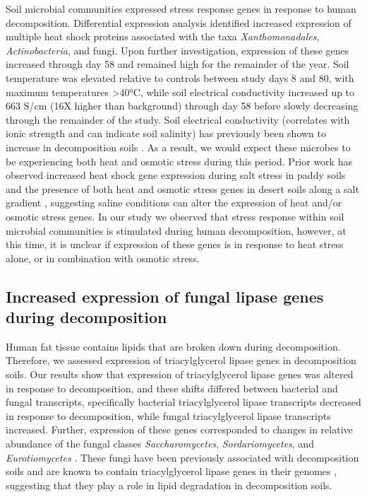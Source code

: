 \documentclass[
  sn-nature,
  lineno, referee]{sn-jnl}
\begin{document}
Soil microbial communities expressed stress response genes in response
to human decomposition. Differential expression analysis identified
increased expression of multiple heat shock proteins associated with the
taxa \emph{Xanthomonadales}, \emph{Actinobacteria}, and fungi. Upon
further investigation, expression of these genes increased through day
58 and remained high for the remainder of the year. Soil temperature was
elevated relative to controls between study days 8 and 80, with maximum
temperatures \textgreater40°C, while soil electrical conductivity
increased up to 663 \textmu S/cm (16X higher than background) through
day 58 before slowly decreasing through the remainder of the study. Soil
electrical conductivity (correlates with ionic strength
\citep{essington_soil_2015} and can indicate soil salinity) has
previously been shown to increase in decomposition soils
\citep{keenan_mortality_2018, fancher_evaluation_2017, quaggiotto_dynamic_2019, taylor_transient_2024}.
As a result, we would expect these microbes to be experiencing both heat
and osmotic stress during this period. Prior work has observed increased
heat shock gene expression during salt stress in paddy soils
\citep{peng_short-term_2017} and the presence of both heat and osmotic
stress genes in desert soils along a salt gradient
\citep{pandit_snapshot_2015}, suggesting saline conditions can alter the
expression of heat and/or osmotic stress genes. In our study we observed
that stress response within soil microbial communities is stimulated
during human decomposition, however, at this time, it is unclear if
expression of these genes is in response to heat stress alone, or in
combination with osmotic stress.

\subsection{Increased expression of fungal lipase genes during
decomposition}\label{increased-expression-of-fungal-lipase-genes-during-decomposition}

Human fat tissue contains lipids that are broken down during
decomposition. Therefore, we assessed expression of triacylglycerol
lipase genes in decomposition soils. Our results show that expression of
triacylglycerol lipase genes was altered in response to decomposition,
and these shifts differed between bacterial and fungal transcripts,
specifically bacterial triacylglycerol lipase transcripts decreased in
response to decomposition, while fungal triacylglycerol lipase
transcripts increased. Further, expression of these genes corresponded
to changes in relative abundance of the fungal classes
\emph{Saccharomycetes}, \emph{Sordariomycetes}, and
\emph{Eurotiomycetes} \citep{taylor_transient_2024}. These fungi have
been previously associated with decomposition soils
\citep{metcalf_microbial_2016, fu_fungal_2019} and are known to contain
triacylglycerol lipase genes in their genomes
\citep{dujon_genome_2004, haridas_genome_2013}, suggesting that they
play a role in lipid degradation in decomposition soils.
\end{document}
